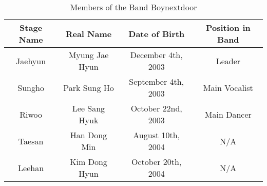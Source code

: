 \begin{table}[h]
    \centering
    \caption{Members of the Band Boynextdoor }
    \label{tab:band_members}
    \begin{tabular}{|c|c|c|c|}
        \hline
        \textbf{Stage Name} & \textbf{Real Name} & \textbf{Date of Birth} & \textbf{Position in Band} \\
        \hline
         Jaehyun & Myung Jae Hyun & December 4th, 2003 & Leader\\
        \hline
        Sungho & Park Sung Ho & September 4th, 2003 & Main Vocalist\\
        \hline
        Riwoo & Lee Sang Hyuk & October 22nd, 2003 & Main Dancer\\
        \hline
        Taesan & Han Dong Min & August 10th, 2004 & N/A\\
        \hline
        Leehan & Kim Dong Hyun & October 20th, 2004 & N/A\\
        \hline
    \end{tabular}
\end{table}
